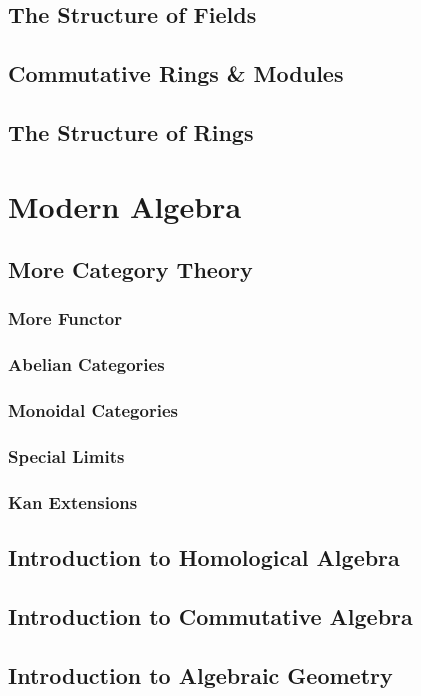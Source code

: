 \documentclass[12pt, a3paper, openany]{book}
\begin{document}
\chapter{The Structure of Fields}
\chapter{Commutative Rings \& Modules}
\chapter{The Structure of Rings}

\part{Modern Algebra}

\chapter{More Category Theory}
\headrule
\startcontents
{}
\section{More Functor}
\section{Abelian Categories}
\section{Monoidal Categories}
\section{Special Limits}
\section{Kan Extensions}
\chapter{Introduction to Homological Algebra}
\chapter{Introduction to Commutative Algebra}
\chapter{Introduction to Algebraic Geometry}
\end{document}
